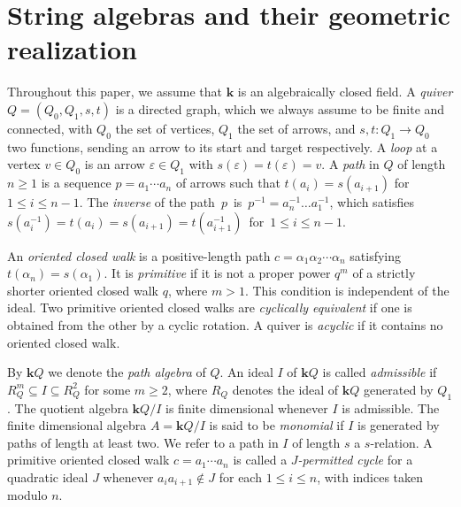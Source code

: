 \documentclass[11pt]{amsart}
\numberwithin{equation}{section}
\theoremstyle{definition}
\begin{document}
\section{String algebras and their geometric realization}\label{String algebras and their geometric realization}

Throughout this paper, we assume that $\mathbf{k}$ is an algebraically closed field. A \textit{quiver} $Q = (Q_0, Q_1, s, t)$ is a directed graph, which we always assume to be finite and connected, with $Q_0$ the set of vertices, $Q_1$ the set of arrows, and $s, t : Q_1 \to Q_0$ two functions, sending an arrow to its start and target respectively. A \textit{loop} at a vertex $v \in Q_0$ is an arrow $\varepsilon \in Q_1$ with $s(\varepsilon) = t(\varepsilon)= v$. 
A \emph{path} in \( Q \) of length \( n \geq 1 \) is a sequence \(p = a_1 \cdots a_n \) of arrows such that \( t(a_i) = s(a_{i+1}) \) for \( 1 \leq i \leq n - 1 \). The \emph{inverse} of the path $p$ is \(p^{-1} = a_n^{-1} \dots a_1^{-1}\), which satisfies \(s(a_i^{-1}) = t(a_i) = s(a_{i + 1}) = t(a_{i + 1}^{-1})\) for \(1 \leq i \leq n - 1\). %

An \emph{oriented closed walk} is a positive-length path $c=\alpha_1\alpha_2\cdots\alpha_n$ satisfying $t(\alpha_n)=s(\alpha_1)$. It is \emph{primitive} if it is not a proper power \(q^m\) of a strictly shorter oriented closed walk \(q\), where \(m>1\). This condition is independent of the ideal. Two primitive oriented closed walks are \emph{cyclically equivalent} if one is obtained from the other by a cyclic rotation. A quiver is \emph{acyclic} if it contains no oriented closed walk.

By \( \mathbf{k}Q \) we denote the \emph{path algebra} of \( Q \). An ideal \( I \) of \( \mathbf{k}Q \) is called \emph{admissible} if \( R_Q^m \subseteq I \subseteq R_Q^2 \) for some \( m \geq 2 \), where \( R_Q \) denotes the ideal of \( \mathbf{k}Q \) generated by \( Q_1 \). The quotient algebra \( \mathbf{k}Q / I \) is finite dimensional whenever \( I \) is admissible. 
The finite dimensional algebra $A = \mathbf{k}Q / I$ is said to be \emph{monomial} if $I$ is generated by paths of length at least two.
We refer to a path in $I$ of length $s$ a $s$-relation. 
A primitive oriented closed walk \(c=a_1\cdots a_n\) is called a \emph{\(J\)-permitted cycle} for a quadratic ideal $J$ whenever \(a_ia_{i+1}\notin J\) for each \(1 \le i \le n\), with indices taken modulo $n$.
\end{document}
